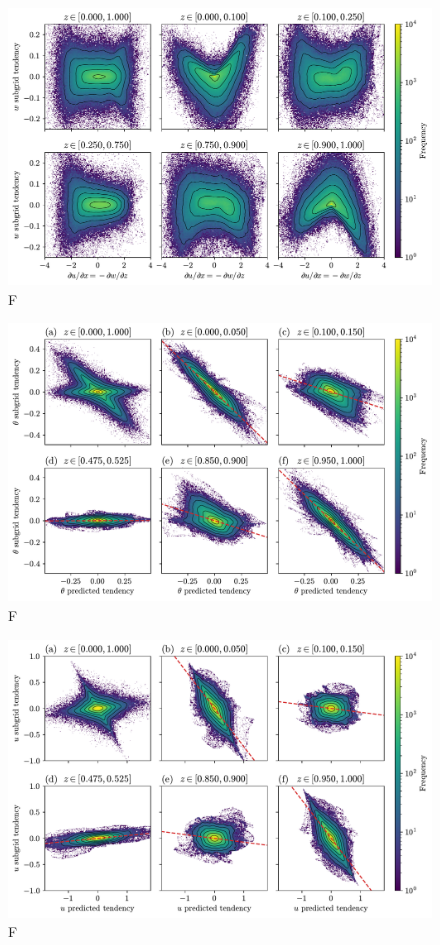 \documentclass[../main.tex]{subfiles}
\begin{document}
\begin{figure}[ht]
    \centering
    \includegraphics[width=\linewidth]{figures/w_vs_dudx.pdf}
    \caption{
        F
    }
    \label{fig:w_vs_dudx}
\end{figure}

\begin{figure}[ht]
    \centering
    \includegraphics[width=\linewidth]{figures/theta_subgrid_vs_pred_tend.pdf}
    \caption{
        F
    }
    \label{fig:theta_subgrid_vs_pred_tend}
\end{figure}

\begin{figure}[ht]
    \centering
    \includegraphics[width=\linewidth]{figures/u_subgrid_vs_pred_tend.pdf}
    \caption{
        F
    }
    \label{fig:u_subgrid_vs_pred_tend}
\end{figure}
\end{document}
